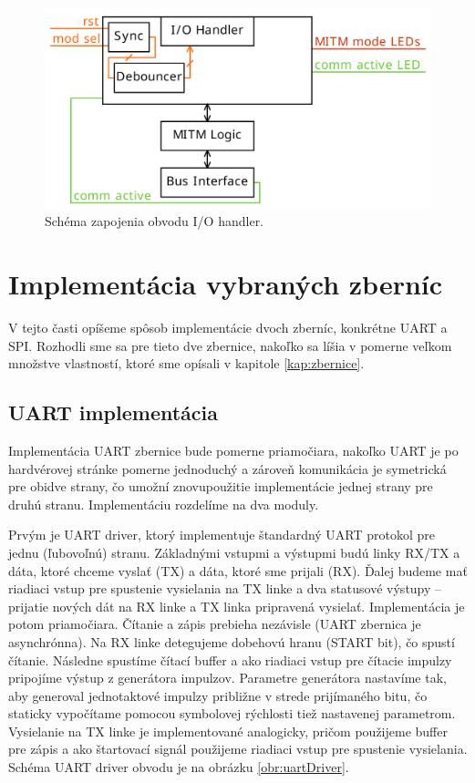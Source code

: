 \begin{figure}
    \centerline{\includegraphics[width=1\textwidth]{images/designs/ioHandler.pdf}}
    \caption[Schéma zapojenia obvodu I/O handler]{Schéma zapojenia obvodu I/O handler.}
    \label{obr:ioHandler}
\end{figure}

\section{Implementácia vybraných zberníc}
V tejto časti opíšeme spôsob implementácie dvoch zberníc, konkrétne UART a SPI. Rozhodli sme sa pre tieto dve zbernice, nakoľko sa líšia v pomerne veľkom množstve vlastností, ktoré sme opísali v kapitole \ref{kap:zbernice}.

\subsection{UART implementácia}
Implementácia UART zbernice bude pomerne priamočiara, nakoľko UART je po hardvérovej stránke pomerne jednoduchý a zároveň komunikácia je symetrická pre obidve strany, čo umožní znovupoužitie implementácie jednej strany pre druhú stranu. Implementáciu rozdelíme na dva moduly.

Prvým je UART driver, ktorý implementuje štandardný UART protokol pre jednu (ľubovoľnú) stranu. Základnými vstupmi a výstupmi budú linky RX/TX a dáta, ktoré chceme vyslať (TX) a dáta, ktoré sme prijali (RX). Ďalej budeme mať riadiaci vstup pre spustenie vysielania na TX linke a dva statusové výstupy -- prijatie nových dát na RX linke a TX linka pripravená vysielať. Implementácia je potom priamočiara. Čítanie a zápis prebieha nezávisle (UART zbernica je asynchrónna). Na RX linke detegujeme dobehovú hranu (START bit), čo spustí čítanie. Následne spustíme čítací buffer a ako riadiaci vstup pre čítacie impulzy pripojíme výstup z generátora impulzov. Parametre generátora nastavíme tak, aby generoval jednotaktové impulzy približne v strede prijímaného bitu, čo staticky vypočítame pomocou symbolovej rýchlosti tiež nastavenej parametrom. Vysielanie na TX linke je implementované analogicky, pričom použijeme buffer pre zápis a ako štartovací signál použijeme riadiaci vstup pre spustenie vysielania. Schéma UART driver obvodu je na obrázku \ref{obr:uartDriver}.

